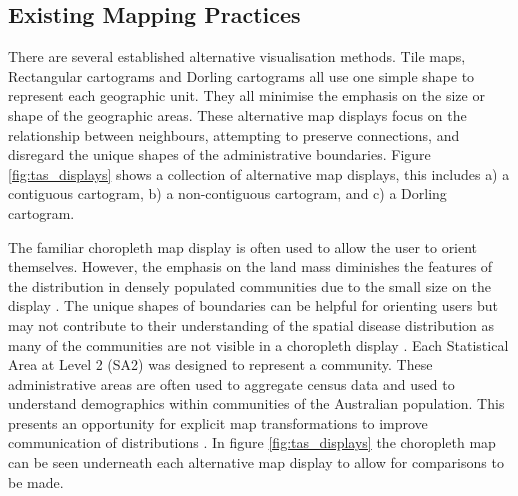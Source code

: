 \hypertarget{existing-mapping-practices}{%
\subsection{Existing Mapping
Practices}\label{existing-mapping-practices}}

There are several established alternative visualisation methods. Tile
maps, Rectangular cartograms \citep{ORC} and Dorling cartograms
\citep{ACTUC} all use one simple shape to represent each geographic
unit. They all minimise the emphasis on the size or shape of the
geographic areas. These alternative map displays focus on the
relationship between neighbours, attempting to preserve connections, and
disregard the unique shapes of the administrative boundaries. Figure
\ref{fig:tas_displays} shows a collection of alternative map displays,
this includes a) a contiguous cartogram, b) a non-contiguous cartogram,
and c) a Dorling cartogram.

The familiar choropleth map display is often used to allow the user to
orient themselves. However, the emphasis on the land mass diminishes the
features of the distribution in densely populated communities due to the
small size on the display \citep{ACTUC}. The unique shapes of boundaries
can be helpful for orienting users but may not contribute to their
understanding of the spatial disease distribution as many of the
communities are not visible in a choropleth display \citep{TVSSS}. Each
Statistical Area at Level 2 (SA2) \citep{abs2011} was designed to
represent a community. These administrative areas are often used to
aggregate census data and used to understand demographics within
communities of the Australian population. This presents an opportunity
for explicit map transformations to improve communication of
distributions \citep{CBATCC}. In figure \ref{fig:tas_displays} the
choropleth map can be seen underneath each alternative map display to
allow for comparisons to be made.

